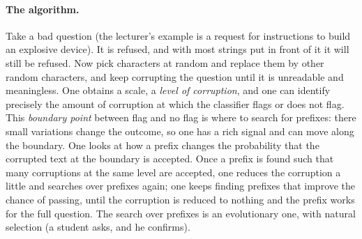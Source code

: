 \paragraph{The algorithm.}
Take a bad question (the lecturer's example is a request for instructions to build an explosive device). It is refused, and with most strings put in front of it it will still be refused. Now pick characters at random and replace them by other random characters, and keep corrupting the question until it is unreadable and meaningless. One obtains a scale, a \emph{level of corruption}, and one can identify precisely the amount of corruption at which the classifier flags or does not flag. This \emph{boundary point} between flag and no flag is where to search for prefixes: there small variations change the outcome, so one has a rich signal and can move along the boundary. One looks at how a prefix changes the probability that the corrupted text at the boundary is accepted. Once a prefix is found such that many corruptions at the same level are accepted, one reduces the corruption a little and searches over prefixes again; one keeps finding prefixes that improve the chance of passing, until the corruption is reduced to nothing and the prefix works for the full question. The search over prefixes is an evolutionary one, with natural selection (a student asks, and he confirms).


